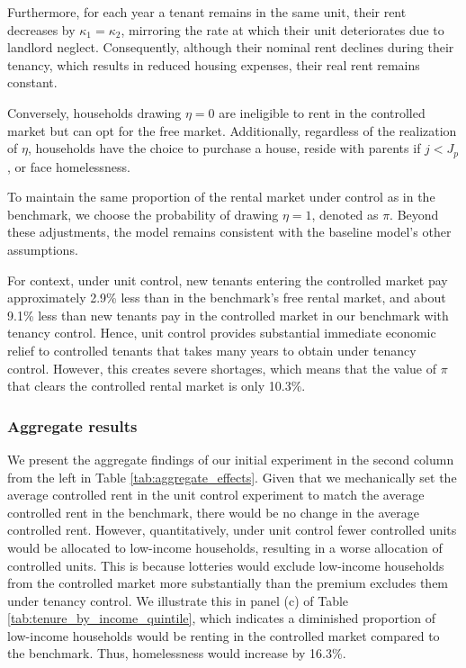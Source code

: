 \documentclass[parskip=full]{article}
\begin{document}
Furthermore, for each year a tenant remains in the same unit, their rent decreases by $\kappa_{1}=\kappa_{2}$, mirroring the rate at which their unit deteriorates due to landlord neglect. Consequently, although their nominal rent declines during their tenancy, which results in reduced housing expenses, their real rent remains constant.

Conversely, households drawing $\eta = 0$ are ineligible to rent in the controlled market but can opt for the free market. Additionally, regardless of the realization of $\eta$, households have the choice to purchase a house, reside with parents if $j<J_{p}$, or face homelessness.

To maintain the same proportion of the rental market under control as in the benchmark, we choose the probability of drawing $\eta = 1$, denoted as $\pi$. Beyond these adjustments, the model remains consistent with the baseline model's other assumptions. 

For context, under unit control, new tenants entering the controlled market pay approximately 2.9\% less than in the benchmark’s free rental market, and about 9.1\% less than new tenants pay in the controlled market in our benchmark with tenancy control. Hence, unit control provides substantial immediate economic relief to controlled tenants that takes many years to obtain under tenancy control. However, this creates severe shortages, which means that the value of $\pi$ that clears the controlled rental market is only 10.3\%.

\subsubsection{Aggregate results}

We present the aggregate findings of our initial experiment in the second column from the left in Table \ref{tab:aggregate_effects}. Given that we mechanically set the average controlled rent in the unit control experiment to match the average controlled rent in the benchmark, there would be no change in the average controlled rent. However, quantitatively, under unit control fewer controlled units would be allocated to low-income households, resulting in a worse allocation of controlled units. This is because lotteries would exclude low-income households from the controlled market more substantially than the premium excludes them under tenancy control. We illustrate this in panel (c) of Table \ref{tab:tenure_by_income_quintile}, which indicates a diminished proportion of low-income households would be renting in the controlled market compared to the benchmark. Thus, homelessness would increase by 16.3\%.
\end{document}
